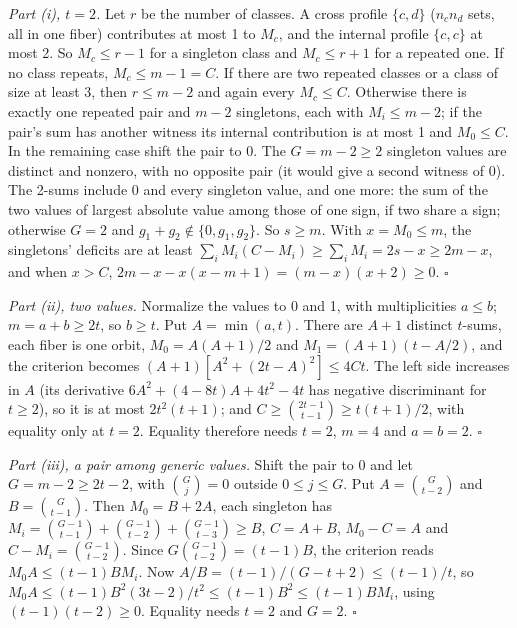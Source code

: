 \documentclass[11pt]{article}
\theoremstyle{plain}
\begin{document}
\emph{Part (i), $t = 2$.} Let $r$ be the number of classes. A cross profile $\{c, d\}$ ($n_c n_d$ sets, all in one fiber) contributes at most 1 to $M_c$, and the internal profile $\{c, c\}$ at most 2. So $M_c \le r - 1$ for a singleton class and $M_c \le r + 1$ for a repeated one. If no class repeats, $M_c \le m - 1 = C$. If there are two repeated classes or a class of size at least 3, then $r \le m - 2$ and again every $M_c \le C$. Otherwise there is exactly one repeated pair and $m - 2$ singletons, each with $M_i \le m - 2$; if the pair's sum has another witness its internal contribution is at most 1 and $M_0 \le C$. In the remaining case shift the pair to 0. The $G = m - 2 \ge 2$ singleton values are distinct and nonzero, with no opposite pair (it would give a second witness of 0). The 2-sums include $0$ and every singleton value, and one more: the sum of the two values of largest absolute value among those of one sign, if two share a sign; otherwise $G = 2$ and $g_1 + g_2 \notin \{0, g_1, g_2\}$. So $s \ge m$. With $x = M_0 \le m$, the singletons' deficits are at least $\sum_i M_i(C - M_i) \ge \sum_i M_i = 2s - x \ge 2m - x$, and when $x > C$,
$2m - x - x(x - m + 1) = (m - x)(x + 2) \ge 0$. $\square$

\emph{Part (ii), two values.} Normalize the values to 0 and 1, with multiplicities $a \le b$; $m = a + b \ge 2t$, so $b \ge t$. Put $A = \min(a, t)$. There are $A + 1$ distinct $t$-sums, each fiber is one orbit, $M_0 = A(A+1)/2$ and $M_1 = (A+1)(t - A/2)$, and the criterion becomes $(A+1)[A^2 + (2t - A)^2] \le 4Ct$. The left side increases in $A$ (its derivative $6A^2 + (4 - 8t)A + 4t^2 - 4t$ has negative discriminant for $t \ge 2$), so it is at most $2t^2(t+1)$; and $C \ge \binom{2t-1}{t-1} \ge t(t+1)/2$, with equality only at $t = 2$. Equality therefore needs $t = 2$, $m = 4$ and $a = b = 2$. $\square$

\emph{Part (iii), a pair among generic values.} Shift the pair to 0 and let $G = m - 2 \ge 2t - 2$, with $\binom{G}{j} = 0$ outside $0 \le j \le G$. Put $A = \binom{G}{t-2}$ and $B = \binom{G}{t-1}$. Then $M_0 = B + 2A$, each singleton has $M_i = \binom{G-1}{t-1} + \binom{G-1}{t-2} + \binom{G-1}{t-3} \ge B$, $C = A + B$, $M_0 - C = A$ and $C - M_i = \binom{G-1}{t-2}$. Since $G\binom{G-1}{t-2} = (t-1)B$, the criterion reads $M_0 A \le (t-1) B M_i$. Now $A/B = (t-1)/(G - t + 2) \le (t-1)/t$, so $M_0 A \le (t-1)B^2(3t-2)/t^2 \le (t-1)B^2 \le (t-1)BM_i$, using $(t-1)(t-2) \ge 0$. Equality needs $t = 2$ and $G = 2$. $\square$
\end{document}
